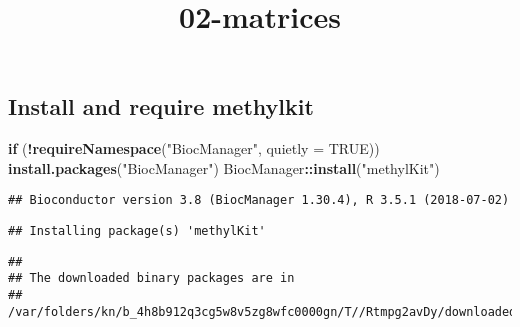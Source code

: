 \documentclass[]{article}
\title{02-matrices}
\author{}
\date{}
\newenvironment{Shaded}{\begin{snugshade}}{\end{snugshade}}
\newcommand{\KeywordTok}[1]{\textcolor[rgb]{0.13,0.29,0.53}{\textbf{#1}}}
\newcommand{\DataTypeTok}[1]{\textcolor[rgb]{0.13,0.29,0.53}{#1}}
\newcommand{\StringTok}[1]{\textcolor[rgb]{0.31,0.60,0.02}{#1}}
\newcommand{\OtherTok}[1]{\textcolor[rgb]{0.56,0.35,0.01}{#1}}
\newcommand{\ControlFlowTok}[1]{\textcolor[rgb]{0.13,0.29,0.53}{\textbf{#1}}}
\newcommand{\OperatorTok}[1]{\textcolor[rgb]{0.81,0.36,0.00}{\textbf{#1}}}
\newcommand{\NormalTok}[1]{#1}
\begin{document}
\maketitle

\subsection{Install and require
methylkit}\label{install-and-require-methylkit}

\begin{Shaded}
\begin{Highlighting}[]
\ControlFlowTok{if}\NormalTok{ (}\OperatorTok{!}\KeywordTok{requireNamespace}\NormalTok{(}\StringTok{"BiocManager"}\NormalTok{, }\DataTypeTok{quietly =} \OtherTok{TRUE}\NormalTok{))}
    \KeywordTok{install.packages}\NormalTok{(}\StringTok{"BiocManager"}\NormalTok{)}
\NormalTok{BiocManager}\OperatorTok{::}\KeywordTok{install}\NormalTok{(}\StringTok{"methylKit"}\NormalTok{)}
\end{Highlighting}
\end{Shaded}

\begin{verbatim}
## Bioconductor version 3.8 (BiocManager 1.30.4), R 3.5.1 (2018-07-02)
\end{verbatim}

\begin{verbatim}
## Installing package(s) 'methylKit'
\end{verbatim}

\begin{verbatim}
## 
## The downloaded binary packages are in
##  /var/folders/kn/b_4h8b912q3cg5w8v5zg8wfc0000gn/T//Rtmpg2avDy/downloaded_packages
\end{verbatim}
\end{document}
